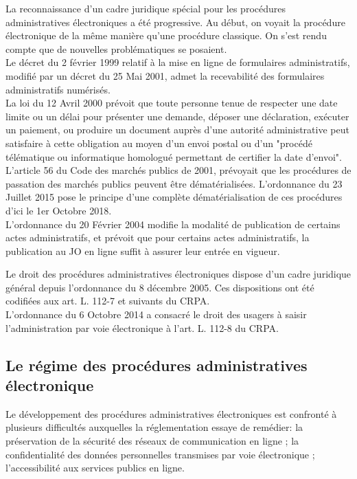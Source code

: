 \documentclass[10pt, a4paper, openany]{book}
\begin{document}
La reconnaissance d'un cadre juridique spécial pour les procédures administratives électroniques a été progressive. Au début, on voyait la procédure électronique de la même manière qu'une procédure classique. On s'est rendu compte que de nouvelles problématiques se posaient. \\
Le décret du 2 février 1999 relatif à la mise en ligne de formulaires administratifs, modifié par un décret du 25 Mai 2001, admet la recevabilité des formulaires administratifs numérisés. \\
La loi du 12 Avril 2000 prévoit que toute personne tenue de respecter une date limite ou un délai pour présenter une demande, déposer une déclaration, exécuter un paiement, ou produire un document auprès d'une autorité administrative peut satisfaire à cette obligation au moyen d'un envoi postal ou d'un "procédé télématique ou informatique homologué permettant de certifier la date d'envoi". \\
L'article 56 du Code des marchés publics de 2001, prévoyait que les procédures de passation des marchés publics peuvent être dématérialisées. L'ordonnance du 23 Juillet 2015 pose le principe d'une complète dématérialisation de ces procédures d'ici le 1er Octobre 2018. \\
L'ordonnance du 20 Février 2004 modifie la modalité de publication de certains actes administratifs, et prévoit que pour certains actes administratifs, la publication au JO en ligne suffit à assurer leur entrée en vigueur.


Le droit des procédures administratives électroniques dispose d'un cadre juridique général depuis l'ordonnance du 8 décembre 2005. Ces dispositions ont été codifiées aux art. L. 112-7 et suivants du CRPA. \\
L'ordonnance du 6 Octobre 2014 a consacré le droit des usagers à saisir l'administration par voie électronique à l'art. L. 112-8 du CRPA. 

\subsection{Le régime des procédures administratives électronique}

Le développement des procédures administratives électroniques est confronté à plusieurs difficultés auxquelles la réglementation essaye de remédier: la préservation de la sécurité des réseaux de communication en ligne ; la confidentialité des données personnelles transmises par voie électronique ; l'accessibilité aux services publics en ligne. 
\end{document}
